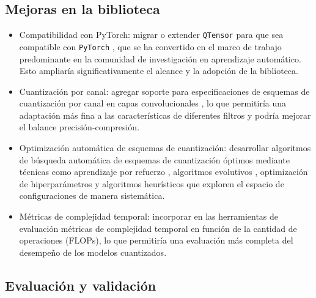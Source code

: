 \subsection{Mejoras en la biblioteca}

\begin{itemize}
    \item Compatibilidad con PyTorch: migrar o extender \texttt{QTensor} para que sea compatible con \texttt{PyTorch} \cite{pytorch}, que se ha convertido en el marco de trabajo predominante en la comunidad de investigación en aprendizaje automático. Esto ampliaría significativamente el alcance y la adopción de la biblioteca.

    \item Cuantización por canal: agregar soporte para especificaciones de esquemas de cuantización por canal en capas convolucionales \cite{Jacob2018}, lo que permitiría una adaptación más fina a las características de diferentes filtros y podría mejorar el balance precisión-compresión.


    \item Optimización automática de esquemas de cuantización: desarrollar algoritmos de búsqueda automática de esquemas de cuantización óptimos mediante técnicas como aprendizaje por refuerzo \cite{dong2019hawqv2hessianawaretraceweighted}, algoritmos evolutivos \cite{dong2019hawqv2hessianawaretraceweighted}, optimización de hiperparámetros \cite{wu2020autoq} y algoritmos heurísticos \cite{louizos2018relaxed} que exploren el espacio de configuraciones de manera sistemática.

    \item Métricas de complejidad temporal: incorporar en las herramientas de evaluación métricas de complejidad temporal en función de la cantidad de operaciones (FLOPs), lo que permitiría una evaluación más completa del desempeño de los modelos cuantizados.

\end{itemize}

\subsection{Evaluación y validación}

